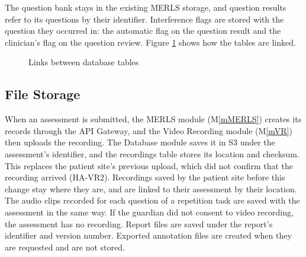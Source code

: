 \documentclass[12pt, titlepage]{article}
\newcommand{\mref}[1]{M\ref{#1}}
\begin{document}
The question bank stays in the existing MERLS storage, and question results refer to its questions by their identifier. Interference flags are stored with the question they occurred in: the automatic flag on the question result and the clinician's flag on the question review. Figure \ref{FigER} shows how the tables are linked.

\begin{figure}[H]
\centering
{}
\caption{Links between database tables}
\label{FigER}
\end{figure}

\subsection{File Storage}

When an assessment is submitted, the MERLS module (\mref{mMERLS}) creates its records through the API Gateway, and the Video Recording module (\mref{mVR}) then uploads the recording. The Database module saves it in S3 under the assessment's identifier, and the recordings table stores its location and checksum. This replaces the patient site's previous upload, which did not confirm that the recording arrived (HA-VR2). Recordings saved by the patient site before this change stay where they are, and are linked to their assessment by their location. The audio clips recorded for each question of a repetition task are saved with the assessment in the same way. If the guardian did not consent to video recording, the assessment has no recording. Report files are saved under the report's identifier and version number. Exported annotation files are created when they are requested and are not stored.
\end{document}
